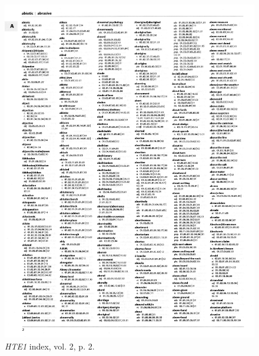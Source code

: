 \begin{figure}[htbp]
  \centering
    \includegraphics[width=\linewidth]{Stolk_thes-content/fig/thes/HTE1-vol2-p002.jpg}
  \caption{\textit{HTE1} index, vol. 2, p. 2.}
  \label{fig:1.A:HTE1:index}
\end{figure}



